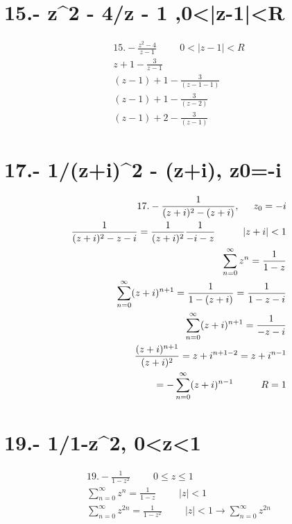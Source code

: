 \documentclass{article}
\begin{document}
\section*{15.- z^2 - 4/z - 1 ,0<|z-1|<R }
\begin{align*}
15.- \frac{z^2 - 4}{z - 1} \hspace{1cm} 0 < |z - 1| < R \\
z + 1 - \frac{3}{z - 1} \\
(z - 1) + 1 - \frac{3}{(z - 1 - 1)} \\
(z - 1) + 1 - \frac{3}{(z - 2)} \\
(z - 1) + 2 - \frac{3}{(z - 1)}
\end{align*}
\section*{17.- 1/(z+i)^2 - (z+i), z0=-i}
\begin{align*}
17.- \frac{1}{(z+i)^2 - (z+i)}, \hspace{0.5cm} z_0 = -i \\
\frac{1}{(z+i)^2 - z - i} = \frac{1}{(z+i)^2} \frac{1}{-i - z} \hspace{1cm} |z + i| < 1 \\
\sum_{n=0}^\infty z^n = \frac{1}{1-z} \\
\sum_{n=0}^\infty (z+i)^{n+1} = \frac{1}{1-(z+i)} = \frac{1}{1-z-i} \\
\sum_{n=0}^\infty (z+i)^{n+1} = \frac{1}{-z-i} \\
\frac{(z+i)^{n+1}}{(z+i)^2} = z + i^{n+1-2} = z + i^{n-1} \\
= -\sum_{n=0}^\infty (z+i)^{n-1} \hspace{1cm} R = 1 \\
\end{align*}
\section*{19.- 1/1-z^2, 0<z<1}
\begin{align*}
19.- \frac{1}{1-z^2} \hspace{1cm} 0 \le z \le 1 \\
\sum_{n=0}^\infty z^n = \frac{1}{1-z} \hspace{1cm} |z| < 1 \\
\sum_{n=0}^\infty z^{2n} = \frac{1}{1-z^2} \hspace{1cm} |z| < 1 \rightarrow \sum_{n=0}^\infty z^{2n}
\end{align*}
\end{document}
